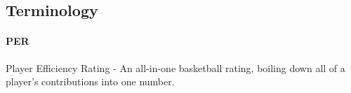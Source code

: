 \documentclass{sigchi}
\begin{document}
%
%
%
%
%
\balance{}

%
\printbibliography

\begin{appendices}

    \section{Terminology}\label{sec:terminology}

    \paragraph{PER} Player Efficiency Rating - An all-in-one basketball rating,
    boiling down all of a player's contributions into one number\cite{per}.
\end{appendices}
\end{document}
